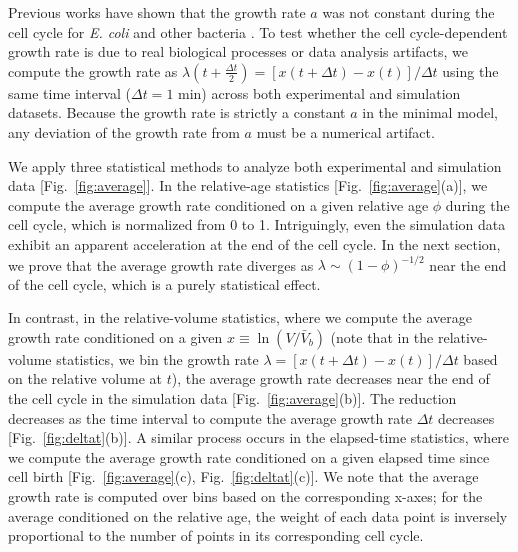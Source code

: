 \documentclass[aps, prl, longbibliography, linenumbers, superscriptaddress]{revtex4-2}
\begin{document}
Previous works have shown that the growth rate $a$ was not constant during the cell cycle for {\it E. coli} and other bacteria \cite{Kar2021distinguishing, Cylke2023super, Cylke2025gene}. To test whether the cell cycle-dependent growth rate is due to real biological processes or data analysis artifacts, we compute the growth rate as $\lambda (t+\frac{\Delta t}{2}) = [x(t+\Delta t) - x(t)]/\Delta t$ using the same time interval ($\Delta t = 1$ min) across both experimental and simulation datasets. Because the growth rate is strictly a constant $a$ in the minimal model, any deviation of the growth rate from $a$ must be a numerical artifact.

We apply three statistical methods to analyze both experimental and simulation data [Fig.~\ref{fig:average}]. In the relative-age statistics [Fig.~\ref{fig:average}(a)], we compute the average growth rate conditioned on a given relative age $\phi$ during the cell cycle, which is normalized from 0 to 1. Intriguingly, even the simulation data exhibit an apparent acceleration at the end of the cell cycle. In the next section, we prove that the average growth rate diverges as $\lambda \sim (1-\phi)^{-1/2}$ near the end of the cell cycle, which is a purely statistical effect.

In contrast, in the relative-volume statistics, where we compute the average growth rate conditioned on a given $x\equiv \ln(V/\bar{V}_b)$ (note that in the relative-volume statistics, we bin the growth rate $\lambda = [x(t+\Delta t) - x(t)]/\Delta t$ based on the relative volume at $t$), the average growth rate decreases near the end of the cell cycle in the simulation data [Fig.~\ref{fig:average}(b)]. The reduction decreases as the time interval to compute the average growth rate $\Delta t$ decreases [Fig.~\ref{fig:deltat}(b)]. A similar process occurs in the elapsed-time statistics, where we compute the average growth rate conditioned on a given elapsed time since cell birth [Fig.~\ref{fig:average}(c), Fig.~\ref{fig:deltat}(c)]. We note that the average growth rate is computed over bins based on the corresponding x-axes; for the average conditioned on the relative age, the weight of each data point is inversely proportional to the number of points in its corresponding cell cycle.
\end{document}
